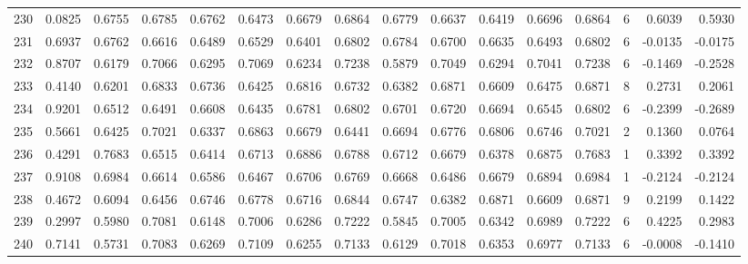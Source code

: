 \begin{tabular}{lrrrrrrrrrrrrrrr}
230 &      0.0825 &  0.6755 &  0.6785 &  0.6762 &  0.6473 &  0.6679 &  0.6864 &  0.6779 &  0.6637 &  0.6419 &   0.6696 &     0.6864 &      6 &                    0.6039 &                     0.5930 \\
231 &      0.6937 &  0.6762 &  0.6616 &  0.6489 &  0.6529 &  0.6401 &  0.6802 &  0.6784 &  0.6700 &  0.6635 &   0.6493 &     0.6802 &      6 &                   -0.0135 &                    -0.0175 \\
232 &      0.8707 &  0.6179 &  0.7066 &  0.6295 &  0.7069 &  0.6234 &  0.7238 &  0.5879 &  0.7049 &  0.6294 &   0.7041 &     0.7238 &      6 &                   -0.1469 &                    -0.2528 \\
233 &      0.4140 &  0.6201 &  0.6833 &  0.6736 &  0.6425 &  0.6816 &  0.6732 &  0.6382 &  0.6871 &  0.6609 &   0.6475 &     0.6871 &      8 &                    0.2731 &                     0.2061 \\
234 &      0.9201 &  0.6512 &  0.6491 &  0.6608 &  0.6435 &  0.6781 &  0.6802 &  0.6701 &  0.6720 &  0.6694 &   0.6545 &     0.6802 &      6 &                   -0.2399 &                    -0.2689 \\
235 &      0.5661 &  0.6425 &  0.7021 &  0.6337 &  0.6863 &  0.6679 &  0.6441 &  0.6694 &  0.6776 &  0.6806 &   0.6746 &     0.7021 &      2 &                    0.1360 &                     0.0764 \\
236 &      0.4291 &  0.7683 &  0.6515 &  0.6414 &  0.6713 &  0.6886 &  0.6788 &  0.6712 &  0.6679 &  0.6378 &   0.6875 &     0.7683 &      1 &                    0.3392 &                     0.3392 \\
237 &      0.9108 &  0.6984 &  0.6614 &  0.6586 &  0.6467 &  0.6706 &  0.6769 &  0.6668 &  0.6486 &  0.6679 &   0.6894 &     0.6984 &      1 &                   -0.2124 &                    -0.2124 \\
238 &      0.4672 &  0.6094 &  0.6456 &  0.6746 &  0.6778 &  0.6716 &  0.6844 &  0.6747 &  0.6382 &  0.6871 &   0.6609 &     0.6871 &      9 &                    0.2199 &                     0.1422 \\
239 &      0.2997 &  0.5980 &  0.7081 &  0.6148 &  0.7006 &  0.6286 &  0.7222 &  0.5845 &  0.7005 &  0.6342 &   0.6989 &     0.7222 &      6 &                    0.4225 &                     0.2983 \\
240 &      0.7141 &  0.5731 &  0.7083 &  0.6269 &  0.7109 &  0.6255 &  0.7133 &  0.6129 &  0.7018 &  0.6353 &   0.6977 &     0.7133 &      6 &                   -0.0008 &                    -0.1410 \\

\end{tabular}
